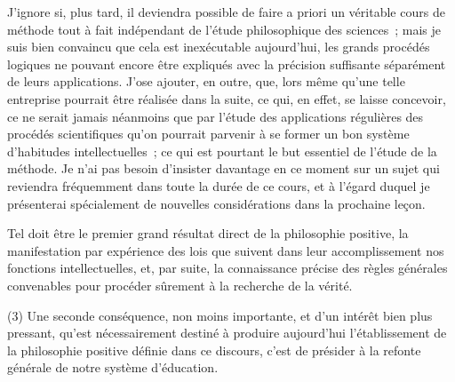 \documentclass[french,twoside]{book} %
\begin{document}
J’ignore si, plus tard, il deviendra possible de faire a priori un véritable cours de méthode tout à fait indépendant de l’étude philosophique des sciences ; mais je suis bien convaincu que cela est inexécutable aujourd’hui, les grands procédés logiques ne pouvant encore être expliqués avec la précision suffisante séparément de leurs applications. J’ose ajouter, en outre, que, lors même qu’une telle entreprise pourrait être réalisée dans la suite, ce qui, en effet, se laisse concevoir, ce ne serait jamais néanmoins que par l’étude des applications régulières des procédés scientifiques qu’on pourrait parvenir à se former un bon système d’habitudes intellectuelles ; ce qui est pourtant le but essentiel de l’étude de la méthode. Je n’ai pas besoin d’insister davantage en ce moment sur un sujet qui reviendra fréquemment dans toute la durée de ce cours, et à l’égard duquel je présenterai spécialement de nouvelles considérations dans la prochaine leçon.\par
Tel doit être le premier grand résultat direct de la philosophie positive, la manifestation par expérience des lois que suivent dans leur accomplissement nos fonctions intellectuelles, et, par suite, la connaissance précise des règles générales convenables pour procéder sûrement à la recherche de la vérité.\par
(3) Une seconde conséquence, non moins importante, et d’un intérêt bien plus pressant, qu’est nécessairement destiné à produire aujourd’hui l’établissement de la philosophie positive définie dans ce discours, c’est de présider à la refonte générale de notre système d’éducation.\par
\end{document}
